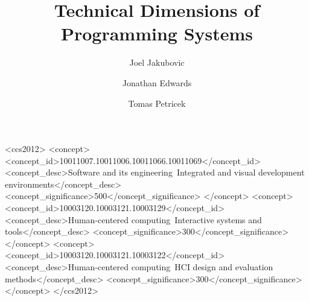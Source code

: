 \documentclass[english,submission]{programming}
\begin{document}

\title{Technical Dimensions of Programming Systems}

\author{Joel Jakubovic}
\author{Jonathan Edwards}
\author{Tomas Petricek}


\begin{CCSXML}
<ccs2012>
   <concept>
       <concept_id>10011007.10011006.10011066.10011069</concept_id>
       <concept_desc>Software and its engineering~Integrated and visual development environments</concept_desc>
       <concept_significance>500</concept_significance>
       </concept>
   <concept>
       <concept_id>10003120.10003121.10003129</concept_id>
       <concept_desc>Human-centered computing~Interactive systems and tools</concept_desc>
       <concept_significance>300</concept_significance>
       </concept>
   <concept>
       <concept_id>10003120.10003121.10003122</concept_id>
       <concept_desc>Human-centered computing~HCI design and evaluation methods</concept_desc>
       <concept_significance>300</concept_significance>
       </concept>
 </ccs2012>
\end{CCSXML}

\maketitle
\end{document}
